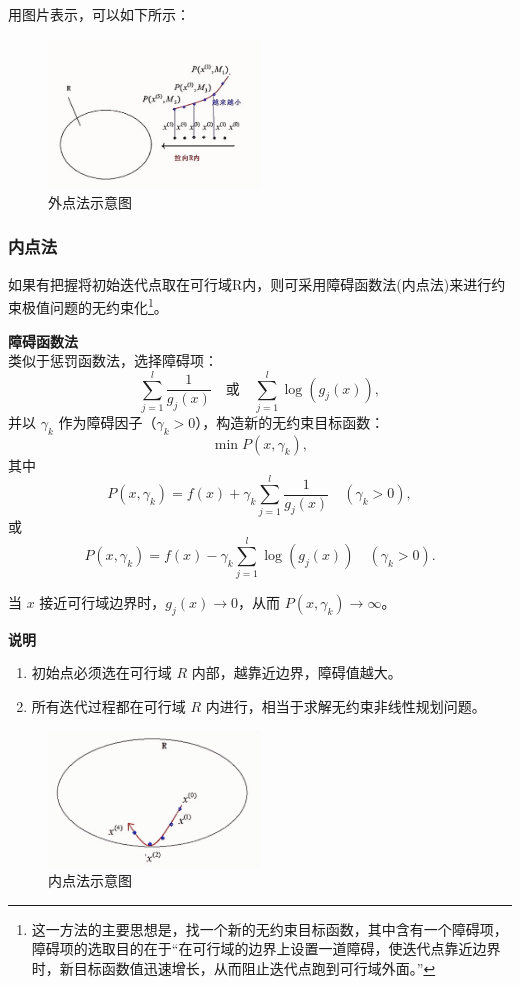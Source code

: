 用图片表示，可以如下所示：
\begin{figure}[H]
    \centering
    \includegraphics[width=0.5\textwidth]{./image/26.png}
    \caption{外点法示意图}
    \label{fig:Chapter4_Temporary_Pavilion_1}
\end{figure}


\subsubsection{内点法}
如果有把握将初始迭代点取在可行域R内，则可采用障碍函数法(内点法)来进行约束极值问题的无约束化\footnote{这一方法的主要思想是，找一个新的无约束目标函数，其中含有一个障碍项，障碍项的选取目的在于“在可行域的边界上设置一道障碍，使迭代点靠近边界时，新目标函数值迅速增长，从而阻止迭代点跑到可行域外面。”}。
\begin{notebox}{\textbf{障碍函数法}}{}
    \\类似于惩罚函数法，选择障碍项：
    \[
    \sum_{j=1}^{l} \frac{1}{g_j(x)} \quad \text{或} \quad \sum_{j=1}^{l} \log(g_j(x)),
    \]
    并以 \(\gamma_k\) 作为障碍因子（\(\gamma_k > 0\)），构造新的无约束目标函数：
    \[
    \min P(x, \gamma_k),
    \]
    其中
    \[
    P(x, \gamma_k) = f(x) + \gamma_k \sum_{j=1}^{l} \frac{1}{g_j(x)} \quad (\gamma_k > 0),
    \]
    或
    \[
    P(x, \gamma_k) = f(x) - \gamma_k \sum_{j=1}^{l} \log(g_j(x)) \quad (\gamma_k > 0).
    \]
    
    当 \(x\) 接近可行域边界时，\(g_j(x) \to 0\)，从而 \(P(x, \gamma_k) \to \infty\)。
\end{notebox}
\textbf{说明}
    \begin{enumerate}
        \item 初始点必须选在可行域 \(R\) 内部，越靠近边界，障碍值越大。
        \item 所有迭代过程都在可行域 \(R\) 内进行，相当于求解无约束非线性规划问题。
    \end{enumerate}
\begin{figure}[H]
    \centering
    \includegraphics[width=0.5\textwidth]{./image/27.png}
    \caption{内点法示意图}
    \label{fig:Chapter4_Temporary_Pavilion_1}
\end{figure}


